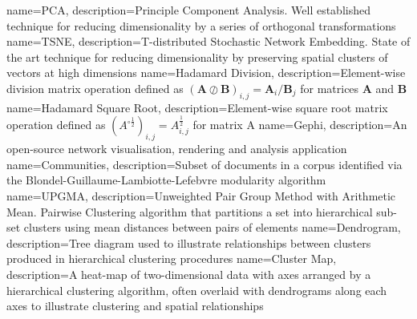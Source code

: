 {
name={PCA},
description={Principle Component Analysis. Well established technique for reducing dimensionality by a series of orthogonal transformations \cite{PCA}} 
}
{
name={TSNE},
description={T-distributed Stochastic Network Embedding. State of the art technique for reducing dimensionality by preserving spatial clusters of vectors at high dimensions \cite{TSNE}} 
}
{
name={Hadamard Division},
description={Element-wise division matrix operation defined as $\left( \mathbf{A} \oslash \mathbf{B} \right)_{i , j} = \mathbf{A}_i / \mathbf{B}_j  $ for matrices $\mathbf{A}$ and $\mathbf{B}$} 
}
{
name={Hadamard Square Root},
description={Element-wise square root matrix operation defined as $\left( A^{\circ\frac{1}{2}} \right)_{i , j} = A_{i , j}^{\frac{1}{2}} $ for matrix A} 
}
{
name={Gephi},
description={An open-source network visualisation, rendering and analysis application} 
}
{
name={Communities},
description={Subset of documents in a corpus identified via the Blondel-Guillaume-Lambiotte-Lefebvre modularity algorithm \cite{modularity1}\cite{modularity2}} 
}
{
name={UPGMA},
description={Unweighted Pair Group Method with Arithmetic Mean. Pairwise Clustering algorithm that partitions a set into hierarchical sub-set clusters using mean distances between pairs of elements \cite{heatmapcluster}} 
}
{
name={Dendrogram},
description={Tree diagram used to illustrate relationships between clusters produced in hierarchical clustering procedures \cite{dendrogram}} 
}
{
name={Cluster Map},
description={A heat-map of two-dimensional data with axes arranged by a hierarchical clustering algorithm, often overlaid with dendrograms along each axes to illustrate clustering and spatial relationships \cite{dendrogram} \cite{seaborn} \cite{scipy}} 
}